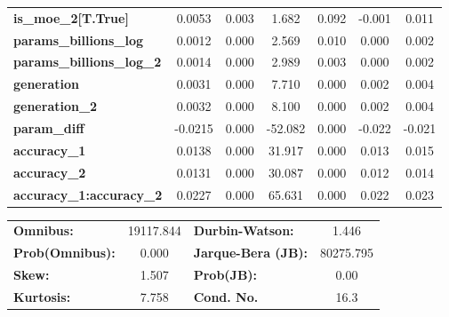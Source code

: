 \begin{center}
\begin{tabular}{lcccccc}
\textbf{is\_moe\_2[T.True]}         &       0.0053  &        0.003     &     1.682  &         0.092        &       -0.001    &        0.011     \\
\textbf{params\_billions\_log}      &       0.0012  &        0.000     &     2.569  &         0.010        &        0.000    &        0.002     \\
\textbf{params\_billions\_log\_2}   &       0.0014  &        0.000     &     2.989  &         0.003        &        0.000    &        0.002     \\
\textbf{generation}                 &       0.0031  &        0.000     &     7.710  &         0.000        &        0.002    &        0.004     \\
\textbf{generation\_2}              &       0.0032  &        0.000     &     8.100  &         0.000        &        0.002    &        0.004     \\
\textbf{param\_diff}                &      -0.0215  &        0.000     &   -52.082  &         0.000        &       -0.022    &       -0.021     \\
\textbf{accuracy\_1}                &       0.0138  &        0.000     &    31.917  &         0.000        &        0.013    &        0.015     \\
\textbf{accuracy\_2}                &       0.0131  &        0.000     &    30.087  &         0.000        &        0.012    &        0.014     \\
\textbf{accuracy\_1:accuracy\_2}    &       0.0227  &        0.000     &    65.631  &         0.000        &        0.022    &        0.023     \\
\bottomrule
\end{tabular}
\begin{tabular}{lclc}
\textbf{Omnibus:}       & 19117.844 & \textbf{  Durbin-Watson:     } &     1.446  \\
\textbf{Prob(Omnibus):} &    0.000  & \textbf{  Jarque-Bera (JB):  } & 80275.795  \\
\textbf{Skew:}          &    1.507  & \textbf{  Prob(JB):          } &      0.00  \\
\textbf{Kurtosis:}      &    7.758  & \textbf{  Cond. No.          } &      16.3  \\
\bottomrule
\end{tabular}
\end{center}
